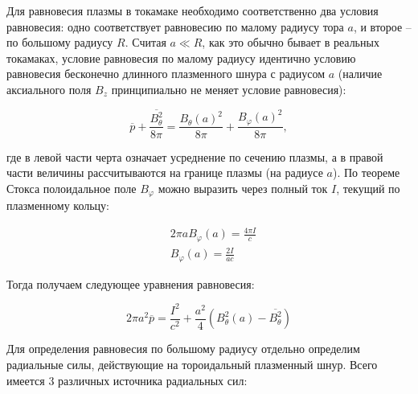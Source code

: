 \documentclass[10pt, a4paper]{article}
\begin{document}
Для равновесия плазмы в токамаке необходимо соответственно два условия равновесия: одно соответствует равновесию по малому радиусу тора $a$, и второе -- по большому радиусу $R$. Считая $a\ll R$, как это обычно бывает в реальных токамаках, условие равновесия по малому радиусу идентично условию равновесия бесконечно длинного плазменного шнура с радиусом $a$ (наличие аксиального поля $B_z$ принципиально не меняет условие равновесия):

\begin{equation*}
   \overline{p} + \frac{\overline{B_\theta^2}}{8\pi} = \frac{B_\theta(a)^2}{8\pi} + \frac{B_\varphi(a)^2}{8\pi},
\end{equation*}

где в левой части черта означает усреднение по сечению плазмы, а в правой части величины рассчитываются на границе плазмы (на радиусе $a$). По теореме Стокса полоидальное поле $B_\varphi$ можно выразить через полный ток $I$, текущий по плазменному кольцу:

\begin{align*}
   &2\pi a B_\varphi(a) = \frac{4\pi I}{c} \\
   &B_\varphi(a) = \frac{2I}{ac}
\end{align*}

Тогда получаем следующее уравнения равновесия:

\begin{equation*}
   2\pi a^2\overline{p} = \frac{I^2}{c^2} + \frac{a^2}{4}\left( B_\theta^2(a) - \overline	{B_\theta^2} \right)
\end{equation*}

Для определения равновесия по большому радиусу отдельно определим радиальные силы, действующие на тороидальный плазменный шнур. Всего имеется 3 различных источника радиальных сил:
\end{document}
